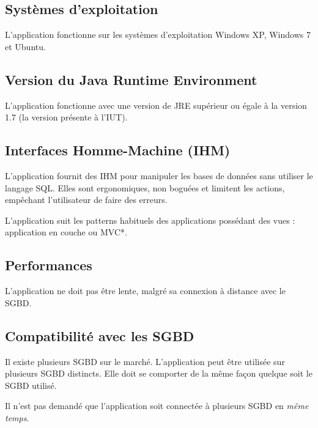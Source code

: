 
\subsection{Systèmes d'exploitation}
L'application fonctionne sur les systèmes d'exploitation Windows XP, Windows 7 et Ubuntu.

\subsection{Version du Java Runtime Environment}
L'application fonctionne avec une version de JRE supérieur ou égale à la version 1.7 (la version présente à l'IUT).

\subsection{Interfaces Homme-Machine (IHM)}
L'application fournit des IHM pour manipuler les bases de données sans utiliser le langage SQL.
Elles sont ergonomiques, non boguées et limitent les actions, empêchant l'utilisateur de faire des erreurs.

L'application suit les patterns habituels des applications possédant des vues :
application en couche ou \gls{MVC}*.

\subsection{Performances}
L'application ne doit pas être lente, malgré sa connexion à distance avec le SGBD.

\subsection{Compatibilité avec les SGBD}
Il existe plusieurs SGBD sur le marché.
L'application peut être utilisée sur plusieurs SGBD distincts.
Elle doit se comporter de la même façon quelque soit le SGBD utilisé.

Il n'est pas demandé que l'application soit connectée à plusieurs SGBD en \textit{même temps}.
